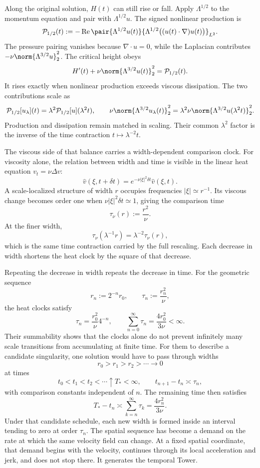 
Along the original solution, \(H(t)\) can still rise or fall.
Apply \(\Lambda^{1/2}\) to the momentum equation and pair with \(\Lambda^{1/2}u\).
The signed nonlinear production is
\[
  \mathcal P_{1/2}(t)
  :=
  -\operatorname{Re}
  \pair
    {\Lambda^{1/2}u(t)}
    {\Lambda^{1/2}\bigl((u(t)\cdot\nabla)u(t)\bigr)}_{L^2}.
\]
The pressure pairing vanishes because \(\nabla\cdot u=0\), while the Laplacian contributes \(-\nu\norm{\Lambda^{3/2}u}_2^2\).
The critical height obeys
\[
  H'(t)
  +
  \nu\norm{\Lambda^{3/2}u(t)}_2^2
  =
  \mathcal P_{1/2}(t).
\]
It rises exactly when nonlinear production exceeds viscous dissipation.
The two contributions scale as
\[
  \mathcal P_{1/2}[u_\lambda](t)
  =
  \lambda^2\mathcal P_{1/2}[u](\lambda^2t),
  \qquad
  \nu\norm{\Lambda^{3/2}u_\lambda(t)}_2^2
  =
  \lambda^2\nu\norm{\Lambda^{3/2}u(\lambda^2t)}_2^2.
\]
Production and dissipation remain matched in scaling.
Their common \(\lambda^2\) factor is the inverse of the time contraction \(t\mapsto\lambda^{-2}t\).


The viscous side of that balance carries a width-dependent comparison clock.
For viscosity alone, the relation between width and time is visible in the linear heat equation \(v_t=\nu\Delta v\):
\[
  \widehat v(\xi,t+\delta t)
  =
  e^{-\nu|\xi|^2\delta t}\widehat v(\xi,t).
\]
A scale-localized structure of width \(r\) occupies frequencies \(|\xi|\simeq r^{-1}\).
Its viscous change becomes order one when \(\nu|\xi|^2\delta t\simeq1\), giving the comparison time
\[
  \tau_\nu(r)
  :=
  \frac{r^2}{\nu}.
\]
At the finer width,
\[
  \tau_\nu(\lambda^{-1}r)
  =
  \lambda^{-2}\tau_\nu(r),
\]
which is the same time contraction carried by the full \NavierStokes{} rescaling.
Each decrease in width shortens the heat clock by the square of that decrease.


Repeating the decrease in width repeats the decrease in time.
For the geometric sequence
\[
  r_n:=2^{-n}r_0,
  \qquad
  \tau_n:=\frac{r_n^2}{\nu},
\]
the heat clocks satisfy
\[
  \tau_n
  =
  \frac{r_0^2}{\nu}4^{-n},
  \qquad
  \sum_{n=0}^{\infty}\tau_n
  =
  \frac{4r_0^2}{3\nu}
  <
  \infty.
\]
Their summability shows that the clocks alone do not prevent infinitely many scale transitions from accumulating at finite time.
For them to describe a candidate singularity, one \NavierStokes{} solution would have to pass through widths
\[
  r_0>r_1>r_2>\cdots\longrightarrow0
\]
at times
\[
  t_0<t_1<t_2<\cdots\uparrow T_*<\infty,
  \qquad
  t_{n+1}-t_n\asymp\tau_n,
\]
with comparison constants independent of \(n\).
The remaining time then satisfies
\[
  T_*-t_n
  \asymp
  \sum_{k=n}^{\infty}\tau_k
  =
  \frac{4r_n^2}{3\nu}.
\]
Under that candidate schedule, each new width is formed inside an interval tending to zero at order \(\tau_n\).
The spatial sequence has become a demand on the rate at which the same velocity field can change.
At a fixed spatial coordinate, that demand begins with the velocity, continues through its local acceleration and jerk, and does not stop there.
It generates the temporal Tower.
